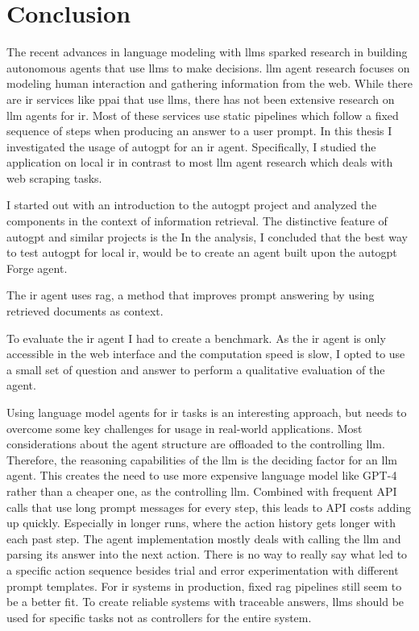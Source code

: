 \documentclass[../main.tex]{subfiles}
\begin{document}
\chapter{Conclusion}
\label{ch:conclusion}
\glsresetall
The recent advances in language modeling with \glspl{llm} sparked research
in building autonomous agents that use \glspl{llm} to make decisions.
\Gls{llm} agent research focuses on modeling human interaction and gathering
information from the web.
While there are \gls{ir} services like \gls{ppai} that use \glspl{llm}, there has not been
extensive research on \gls{llm} agents for \gls{ir}.
Most of these services use static pipelines which follow a fixed sequence of
steps when producing an answer to a user prompt.
In this thesis I investigated the usage of \gls{autogpt} for an \gls{ir} agent.
Specifically, I studied the application on local \gls{ir} in contrast to most \gls{llm}
agent research which deals with web scraping tasks.

I started out with an introduction to the \gls{autogpt} project and analyzed
the components in the context of information retrieval.
The distinctive feature of \gls{autogpt} and similar projects is the
In the analysis, I concluded that the best way to test \gls{autogpt}
for local \gls{ir}, would be to create an agent built upon the \gls{autogpt}
Forge agent.

The \gls{ir} agent uses \gls{rag}, a method that improves prompt answering
by using retrieved documents as context.

To evaluate the \gls{ir} agent I had to create a benchmark.
As the \gls{ir} agent is only accessible in the web interface and
the computation speed is slow, I opted to use a small set of question and answer
to perform a qualitative evaluation of the agent.

Using language model agents for \gls{ir} tasks is an interesting approach,
but needs to overcome some key challenges for usage in real-world applications.
Most considerations about the agent structure are offloaded to the controlling \gls{llm}.
Therefore, the reasoning capabilities of the \gls{llm} is the deciding factor
for an \gls{llm} agent.
This creates the need to use more expensive language model like GPT-4 rather than
a cheaper one, as the controlling \gls{llm}.
Combined with frequent API calls that use long prompt messages for every step,
this leads to API costs adding up quickly.
Especially in longer runs, where the action history gets longer with each past step.
The agent implementation mostly deals with calling the \gls{llm} and parsing
its answer into the next action.
There is no way to really say what led to a specific action sequence besides
trial and error experimentation with different prompt templates.
For \gls{ir} systems in production, fixed \gls{rag} pipelines still seem to
be a better fit.
To create reliable systems with traceable answers, \glspl{llm} should be used for
specific tasks not as controllers for the entire system.
\end{document}
